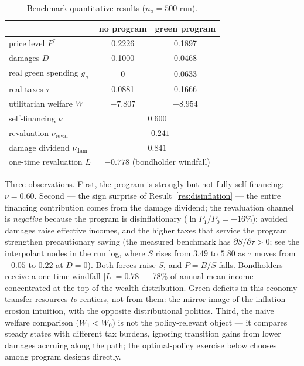 \documentclass[12pt]{article}
\newcommand{\Sfun}{S}
\begin{document}
\begin{table}[!htb]
\centering
\caption{Benchmark quantitative results ($n_a=500$ run).}
\label{tab:benchmark}
\begin{tabular}{lcc}
\toprule
 & no program & green program \\
\midrule
price level $P^{*}$            & 0.2226 & 0.1897 \\
damages $D$                    & 0.1000 & 0.0468 \\
real green spending $g_g$      & 0      & 0.0633 \\
real taxes $\tau$              & 0.0881 & 0.1666 \\
utilitarian welfare $W$        & $-7.807$ & $-8.954$ \\
\midrule
self-financing $\nu$           & \multicolumn{2}{c}{$0.600$} \\
\quad revaluation $\nu_{\mathrm{reval}}$ & \multicolumn{2}{c}{$-0.241$} \\
\quad damage dividend $\nu_{\mathrm{dam}}$ & \multicolumn{2}{c}{$0.841$} \\
one-time revaluation $L$       & \multicolumn{2}{c}{$-0.778$ (bondholder windfall)} \\
\bottomrule
\end{tabular}
\end{table}

Three observations. First, the program is strongly but not fully
self-financing: $\nu=0.60$. Second --- the sign surprise of
Result~\ref{res:disinflation} --- the entire financing contribution comes from
the damage dividend; the revaluation channel is \emph{negative} because the
program is disinflationary ($\ln P_1/P_0 = -16\%$): avoided damages raise
effective incomes, and the higher taxes that service the program strengthen
precautionary saving (the measured benchmark has
$\partial\Sfun/\partial\tau>0$; see the interpolant nodes in the run log,
where $\Sfun$ rises from $3.49$ to $5.80$ as $\tau$ moves from $-0.05$ to
$0.22$ at $D=0$). Both forces raise $\Sfun$, and $P=B/\Sfun$ falls.
Bondholders receive a one-time windfall $|L|=0.78$ --- 78\% of annual mean
income --- concentrated at the top of the wealth distribution. Green deficits
in this economy transfer resources \emph{to} rentiers, not from them: the
mirror image of the inflation-erosion intuition, with the opposite
distributional politics. Third, the naive welfare comparison
($W_1<W_0$) is not the policy-relevant object --- it compares steady states
with different tax burdens, ignoring transition gains from lower damages
accruing along the path; the optimal-policy exercise below chooses among
program designs directly.
\end{document}
